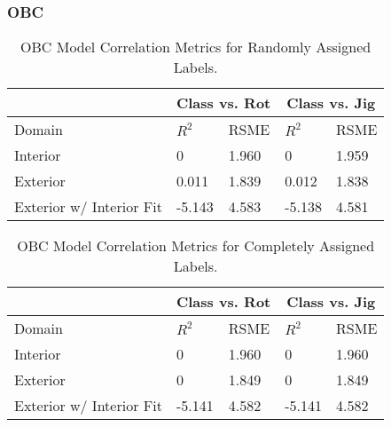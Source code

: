 \documentclass{article}
\begin{document}
\subsubsection{OBC}
\begin{table}[!pt]
  
  \centering
  \caption{OBC Model Correlation Metrics for Randomly Assigned Labels.}\label{tbl:obc}
  \begin{tabular}{lllll}
  \cline{1-5}
  & \multicolumn{2}{c}{Class vs. Rot} & \multicolumn{2}{c}{Class vs. Jig} \\ \hline
  Domain & $R^2$ & RSME & $R^2$ & RSME       \\ \hline
  Interior  &                    0       &  1.960  &   0       &    1.959   \\ 
  Exterior   &                   0.011   &  1.839  &   0.012   &    1.838    \\
  Exterior w/ Interior Fit   &   -5.143  &  4.583  &   -5.138  &    4.581    \\ \hline
  \end{tabular}
\end{table}
\begin{table}[!pt]
  
  \centering
  \caption{OBC Model Correlation Metrics for Completely Assigned Labels.}\label{tbl:obc1}
  \begin{tabular}{lllll}
  \cline{1-5}
  & \multicolumn{2}{c}{Class vs. Rot} & \multicolumn{2}{c}{Class vs. Jig} \\ \hline
  Domain & $R^2$ & RSME & $R^2$ & RSME       \\ \hline
  Interior  &                         0   &  1.960  &        0   &    1.960   \\ 
  Exterior   &                        0   &  1.849  &        0   &    1.849    \\
  Exterior w/ Interior Fit   &   -5.141   &  4.582  &   -5.141   &    4.582    \\ \hline
  \end{tabular}
\end{table}
\end{document}
